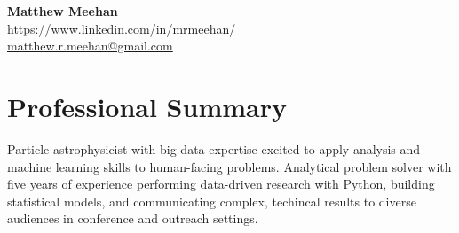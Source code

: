 \documentclass[letterpaper,11pt]{article}
\begin{document}

\begin{center}

    \textbf{\Large Matthew Meehan}\\
    \href{https://www.linkedin.com/in/mrmeehan/}{\faLinkedinSquare}
    \href{https://www.linkedin.com/in/mrmeehan/}{ https://www.linkedin.com/in/mrmeehan/}\\
    \href{mailto:matthew.r.meehan@gmail.com}{\faEnvelopeO}
    \href{mailto:matthew.r.meehan@gmail.com}{matthew.r.meehan@gmail.com}\\

\end{center}

%


\section{Professional Summary}
{\small Particle astrophysicist with big data expertise excited to apply analysis and machine learning skills to human-facing problems. Analytical problem solver with 
five years of experience performing data-driven research with Python, building statistical models, and communicating complex, techincal results to diverse 
audiences in conference and outreach settings.}
\end{document}
